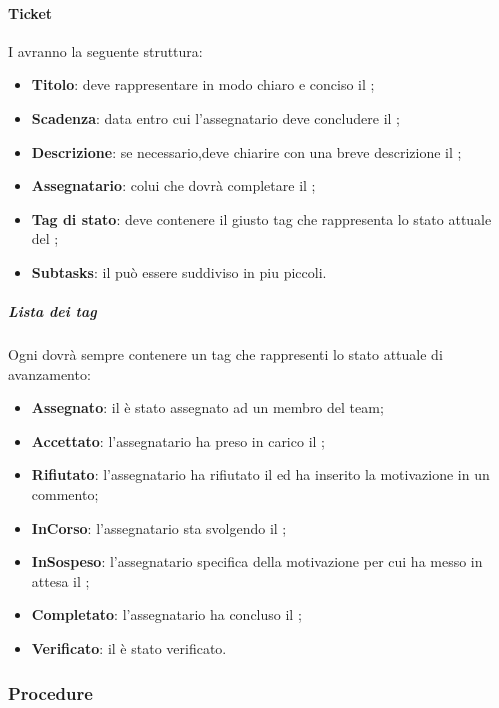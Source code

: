 	\paragraph{Ticket}
	 I  avranno la seguente struttura:
	 \begin{itemize}
	 	\item \textbf{Titolo}: deve rappresentare in modo chiaro e conciso il ;
	 	\item \textbf{Scadenza}: data entro cui l'assegnatario deve concludere il ;
	 	\item \textbf{Descrizione}: se necessario,deve chiarire con una breve descrizione il ;
	 	\item \textbf{Assegnatario}: colui che dovrà completare il ;
	 	\item \textbf{Tag di stato}: deve contenere il giusto tag che rappresenta lo stato attuale del ; 
	 	\item \textbf{Subtasks}: il  può essere suddiviso in  piu piccoli.
	 	\end{itemize}
	 	\subparagraph{Lista dei tag}
	 	Ogni  dovrà sempre contenere un tag che rappresenti lo stato attuale di avanzamento:
	 	\begin{itemize}
	 		\item \textbf{Assegnato}: il  è stato assegnato ad un membro del team;
	 		\item \textbf{Accettato}: l'assegnatario ha preso in carico il ;
	 		\item \textbf{Rifiutato}: l'assegnatario ha rifiutato il  ed ha inserito la motivazione in un commento;
	 		\item \textbf{InCorso}: l'assegnatario sta svolgendo il ;
	 		\item \textbf{InSospeso}: l'assegnatario specifica della motivazione per cui ha messo in attesa il ;
	 		\item \textbf{Completato}: l'assegnatario ha concluso il ;
	 		\item \textbf{Verificato}: il  è stato verificato.
	 		\end{itemize}
\subsubsection{Procedure}
